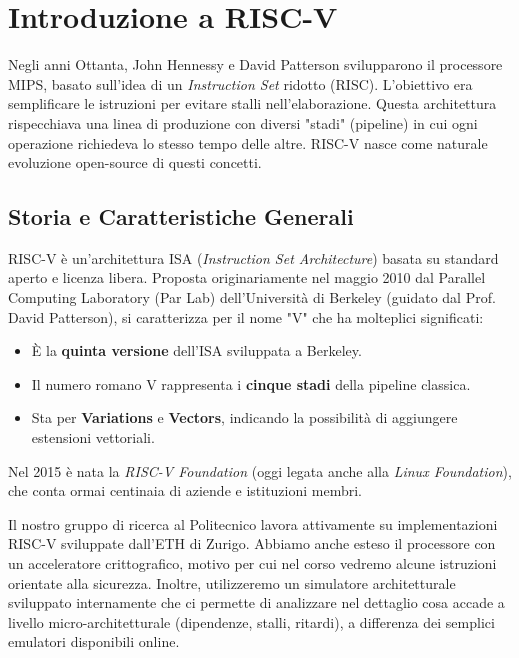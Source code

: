 \chapter{Introduzione a RISC-V}

\begin{remark}
Negli anni Ottanta, John Hennessy e David Patterson svilupparono il processore MIPS, basato sull'idea di un \textit{Instruction Set} ridotto (RISC). L'obiettivo era semplificare le istruzioni per evitare stalli nell'elaborazione. Questa architettura rispecchiava una linea di produzione con diversi "stadi" (pipeline) in cui ogni operazione richiedeva lo stesso tempo delle altre. 
RISC-V nasce come naturale evoluzione open-source di questi concetti.
\end{remark}

\section{Storia e Caratteristiche Generali}

RISC-V è un'architettura ISA (\textit{Instruction Set Architecture}) basata su standard aperto e licenza libera. 
Proposta originariamente nel maggio 2010 dal Parallel Computing Laboratory (Par Lab) dell'Università di Berkeley (guidato dal Prof. David Patterson), si caratterizza per il nome "V" che ha molteplici significati:
\begin{itemize}
    \item È la \textbf{quinta versione} dell'ISA sviluppata a Berkeley.
    \item Il numero romano V rappresenta i \textbf{cinque stadi} della pipeline classica.
    \item Sta per \textbf{Variations} e \textbf{Vectors}, indicando la possibilità di aggiungere estensioni vettoriali.
\end{itemize}

Nel 2015 è nata la \textit{RISC-V Foundation} (oggi legata anche alla \textit{Linux Foundation}), che conta ormai centinaia di aziende e istituzioni membri.

\begin{remark}
Il nostro gruppo di ricerca al Politecnico lavora attivamente su implementazioni RISC-V sviluppate dall'ETH di Zurigo. Abbiamo anche esteso il processore con un acceleratore crittografico, motivo per cui nel corso vedremo alcune istruzioni orientate alla sicurezza. 
Inoltre, utilizzeremo un simulatore architetturale sviluppato internamente che ci permette di analizzare nel dettaglio cosa accade a livello micro-architetturale (dipendenze, stalli, ritardi), a differenza dei semplici emulatori disponibili online.
\end{remark}

